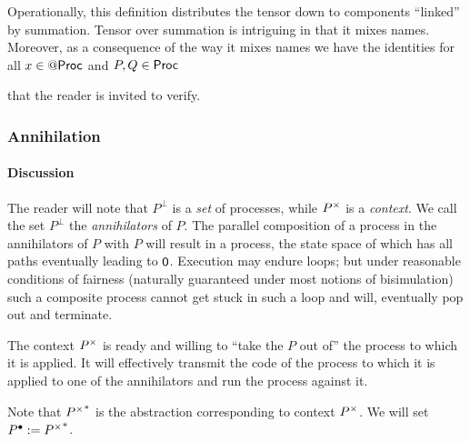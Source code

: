 \begin{remark}
  Operationally, this definition distributes the tensor down to
  components ``linked'' by summation. Tensor over summation is
  intriguing in that it mixes names. Moreover, as a consequence of the
  way it mixes names we have the identities for all $x \in \mathsf{@} \mathsf{Proc}$ and
  $P,Q \in \mathsf{Proc}$


  that the reader is invited to verify.
\end{remark}

\subsubsection{Annihilation}

\paragraph{Discussion} The reader will note that $P^{\perp}$ is a
\emph{set} of processes, while $P^{\times}$ is a
\emph{context}. We call the set $P^{\perp}$ the \emph{annihilators} of
$P$. The parallel composition of a process in the annihilators of $P$
with $P$ will result in a process, the state space of which has all
paths eventually leading to $\mathsf{0}$. Execution may endure loops; but
under reasonable conditions of fairness (naturally guaranteed under
most notions of bisimulation) such a composite process cannot get
stuck in such a loop and will, eventually pop out and terminate.

The context $P^{\times}$ is ready and willing to ``take the
$P$ out of'' the process to which it is applied. It will effectively
transmit the code of the process to which it is applied to one of the
annihilators and run the process against it.

\begin{remark}
  Note that ${P^{\times}}^*$ is the abstraction corresponding to
  context $P^{\times}$. We will set $P^{\bullet} := {P^{\times}}^*$.
\end{remark}

